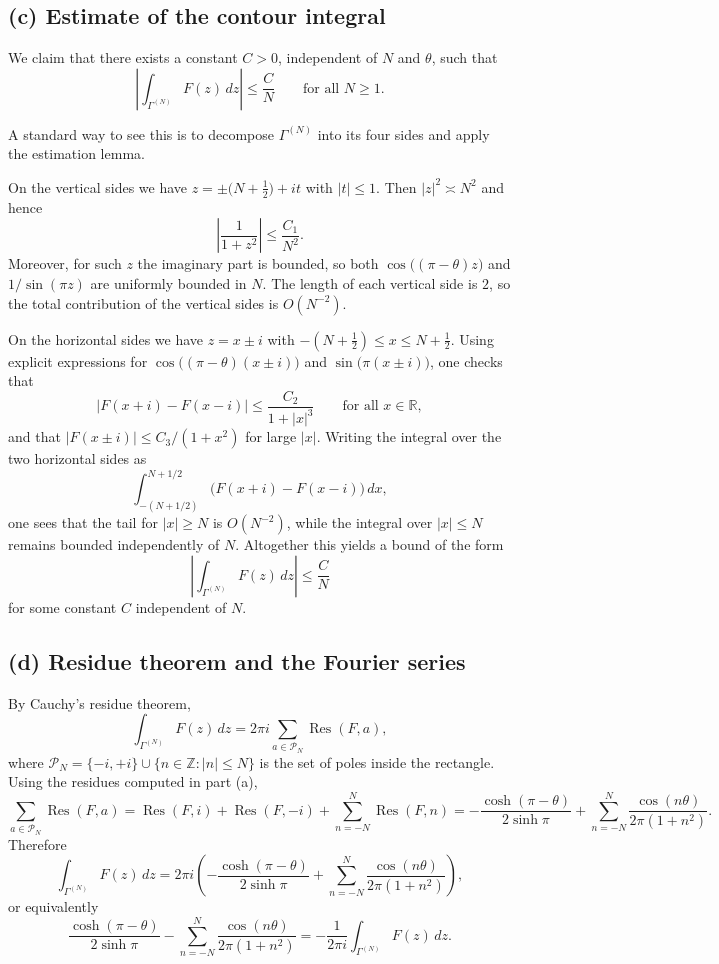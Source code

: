 \documentclass[12pt,a4paper]{article}
\theoremstyle{plain}
\theoremstyle{definition}
\theoremstyle{remark}
\theoremstyle{remark}
\DeclareMathOperator{\Res}{Res}
\begin{document}
\subsection*{(c) Estimate of the contour integral}

We claim that there exists a constant $C>0$, independent of $N$ and $\theta$,
such that
\[
\left|\int_{\Gamma^{(N)}} F(z)\,dz\right|\le \frac{C}{N}
\qquad\text{for all } N\ge1.
\]

A standard way to see this is to decompose $\Gamma^{(N)}$ into its four sides
and apply the estimation lemma.

On the vertical sides we have $z=\pm\bigl(N+\tfrac12\bigr)+it$ with $|t|\le1$.
Then $|z|^2\asymp N^2$ and hence
\[
\left|\frac{1}{1+z^2}\right|\le \frac{C_1}{N^2}.
\]
Moreover, for such $z$ the imaginary part is bounded, so both
$\cos\bigl((\pi-\theta)z\bigr)$ and $1/\sin(\pi z)$ are uniformly bounded in
$N$. The length of each vertical side is $2$, so the total contribution of the
vertical sides is $O(N^{-2})$.

On the horizontal sides we have $z=x\pm i$ with
$-(N+\tfrac12)\le x\le N+\tfrac12$. Using explicit expressions for
$\cos\bigl((\pi-\theta)(x\pm i)\bigr)$ and $\sin\bigl(\pi(x\pm i)\bigr)$, one
checks that
\[
|F(x+i)-F(x-i)| \le \frac{C_2}{1+|x|^3}
\qquad\text{for all }x\in\mathbb{R},
\]
and that $|F(x\pm i)|\le C_3/(1+x^2)$ for large $|x|$. Writing the integral
over the two horizontal sides as
\[
\int_{-(N+1/2)}^{N+1/2} \bigl(F(x+i)-F(x-i)\bigr)\,dx,
\]
one sees that the tail for $|x|\ge N$ is $O(N^{-2})$, while the integral over
$|x|\le N$ remains bounded independently of $N$. Altogether this yields a
bound of the form
\[
\left|\int_{\Gamma^{(N)}} F(z)\,dz\right|
\le \frac{C}{N}
\]
for some constant $C$ independent of $N$.

\subsection*{(d) Residue theorem and the Fourier series}

By Cauchy’s residue theorem,
\[
\int_{\Gamma^{(N)}} F(z)\,dz
=2\pi i\sum_{a\in\mathcal{P}_N}\Res(F,a),
\]
where $\mathcal{P}_N=\{-i,+i\}\cup\{n\in\mathbb{Z}:|n|\le N\}$ is the set of
poles inside the rectangle. Using the residues computed in part (a),
\[
\sum_{a\in\mathcal{P}_N}\Res(F,a)
= \Res(F,i)+\Res(F,-i)
+\sum_{n=-N}^N \Res(F,n)
= -\frac{\cosh(\pi-\theta)}{2\sinh\pi}
+\sum_{n=-N}^N \frac{\cos(n\theta)}{2\pi(1+n^2)}.
\]
Therefore
\[
\int_{\Gamma^{(N)}} F(z)\,dz
= 2\pi i\left(
-\frac{\cosh(\pi-\theta)}{2\sinh\pi}
+\sum_{n=-N}^N \frac{\cos(n\theta)}{2\pi(1+n^2)}
\right),
\]
or equivalently
\[
\frac{\cosh(\pi-\theta)}{2\sinh\pi}
-\sum_{n=-N}^N \frac{\cos(n\theta)}{2\pi(1+n^2)}
= -\frac{1}{2\pi i}\int_{\Gamma^{(N)}} F(z)\,dz.
\]
\end{document}
